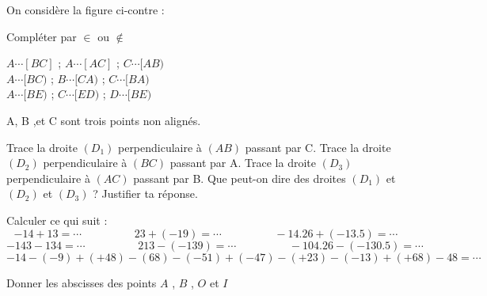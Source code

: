 \documentclass[a4paper,addpoints,12pt]{exam}
\begin{document}
\devoir[prv=false,ds=true,num=2 ,niv=1 , date=16/12/2022 ]

\begin{exo}[5]
\begin{minipage}{.5\linewidth}
On considère la figure ci-contre :
\begin{questions}
\question Compléter par $\in$ ou $\notin$

$A\cdots [BC]$ ; $A\cdots [AC]$ ; $C\cdots [AB)$\\
$A\cdots [BC)$ ; $B\cdots [CA)$ ; $C\cdots [BA)$\\
$A\cdots [BE)$ ; $C\cdots [ED)$ ; $D\cdots [BE)$

\end{questions}
\end{minipage}
\begin{minipage}{.5\linewidth}
\end{minipage}
\end{exo}

\begin{exo}[4]
\begin{minipage}{.6\linewidth}
A, B ,et C sont trois points non alignés. 
\begin{questions}
\question Trace la droite $(D_{1})$ perpendiculaire à $(AB)$ passant par C.
\question Trace la droite $(D_{2})$ perpendiculaire à $(BC)$ passant par A.
\question Trace la droite $(D_{3})$ perpendiculaire à $(AC)$ passant par B.
\question Que peut-on dire des droites $(D_{1})$ et $(D_{2})$ et $(D_{3})$ ? Justifier ta réponse.

\end{questions}
\end{minipage}
\begin{minipage}{.4\linewidth}
\end{minipage}
\end{exo}

\begin{exo}[7]
\begin{questions}
\question Calculer ce qui suit : 
\[-14+13=\cdots \hspace{2cm}
	23+(-19)=\cdots \hspace{2cm}
	-14.26+(-13.5)=\cdots
\]
\[-143-134=\cdots \hspace{2cm}
	213-(-139)=\cdots \hspace{2cm}
	-104.26-(-130.5)=\cdots
\]
\[-14-(-9)+(+48)-(68)-(-51)+(-47)-(+23)-(-13)+(+68)-48=\cdots
\]
\end{questions}
\end{exo}

\begin{exo}[4]
\begin{questions}
\question Donner les abscisses des points $A$ , $B$ , $O$ et $I$ 
\end{questions}
\end{exo}
\end{document}
